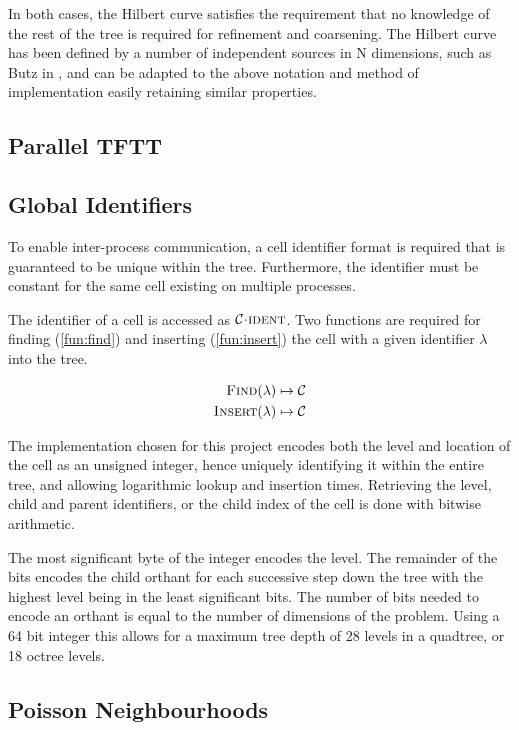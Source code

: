 \documentclass{IIBproject}
\newcommand{\acc}{{\mkern 0.5mu\cdot\mkern 0.5mu}}
\numberwithin{figure}{section}
\begin{document}
In both cases, the Hilbert curve satisfies the requirement that no knowledge of the rest of the tree is required for refinement and coarsening. The Hilbert curve has been defined by a number of independent sources in N dimensions, such as Butz in \cite{butz71}, and can be adapted to the above notation and method of implementation easily retaining similar properties. 


\subsection{Parallel TFTT}


\subsection{Global Identifiers}

To enable inter-process communication, a cell identifier format is required that is guaranteed to be unique within the tree. Furthermore, the identifier must be constant for the same cell existing on multiple processes.

The identifier of a cell is accessed as $\mathcal{C}\acc\textproc{ident}$. Two functions are required for finding (\ref{fun:find}) and inserting (\ref{fun:insert}) the cell with a given identifier $\lambda$ into the tree.

\begin{align}
    \label{fun:find}
    \textproc{Find}(\lambda) \mapsto \mathcal{C} \\
    \label{fun:insert}
    \textproc{Insert}(\lambda) \mapsto \mathcal{C}
\end{align}

The implementation chosen for this project encodes both the level and location of the cell as an unsigned integer, hence uniquely identifying it within the entire tree, and allowing logarithmic lookup and insertion times. Retrieving the level, child and parent identifiers, or the child index of the cell is done with bitwise arithmetic.

The most significant byte of the integer encodes the level. The remainder of the bits encodes the child orthant for each successive step down the tree with the highest level being in the least significant bits. The number of bits needed to encode an orthant is equal to the number of dimensions of the problem. Using a 64 bit integer this allows for a maximum tree depth of 28 levels in a quadtree, or 18 octree levels.


\subsection{Poisson Neighbourhoods}
\end{document}
